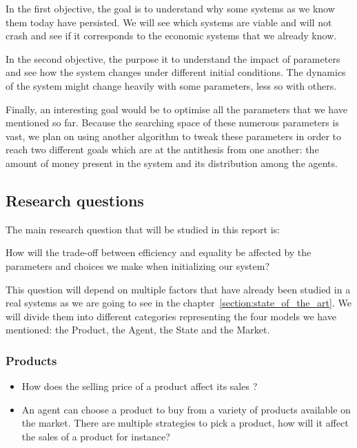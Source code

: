 In the first objective, the goal is to understand why some systems as we know them today have persisted. We will see which systems are viable and will not crash and see if it corresponds to the economic systems that we already know.

In the second objective, the purpose it to understand the impact of parameters and see how the system changes under different initial conditions. The dynamics of the system might change heavily with some parameters, less so with others.

Finally, an interesting goal would be to optimise all the parameters that we have mentioned so far. Because the searching space of these numerous parameters is vast, we plan on using another algorithm to tweak these parameters in order to reach two different goals which are at the antithesis from one another: the amount of money present in the system and its distribution among the agents. 

\subsection{Research questions}

The main research question that will be studied in this report is:

\vspace*{0.5cm}

\begin{center}
    How will the trade-off between efficiency and equality be affected by the parameters and choices we make when initializing our system?
\end{center}

\vspace*{0.5cm}

This question will depend on multiple factors that have already been studied in a real systems as we are going to see in the  chapter~\ref{section:state_of_the_art}. We will divide them into different categories representing the four models we have mentioned: the Product, the Agent, the State and the Market. 

\subsubsection{Products}

\begin{itemize}
    \item How does the selling price of a product affect its sales ?
    \item An agent can choose a product to buy from a variety of products available on the market. There are multiple strategies to pick a product, how will it affect the sales of a product for instance?
\end{itemize}


